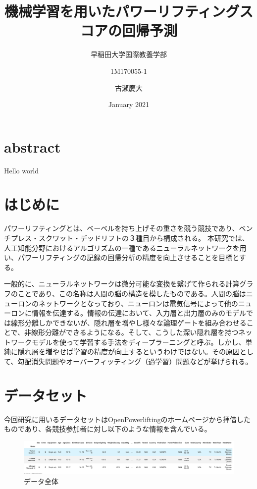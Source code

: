 \documentclass{article}
\title{機械学習を用いたパワーリフティングスコアの回帰予測}
\author{早稲田大学国際教養学部 }
\author{1M170055-1 }
\author{古瀬慶大 }
\date{January 2021}
\begin{document}
\maketitle

\section{abstract}
Hello world




\section{はじめに}
パワーリフティングとは、ベーベルを持ち上げその重さを競う競技であり、ベンチプレス・スクワット・デッドリフトの３種目から構成される。
本研究では、人工知能分野におけるアルゴリズムの一種であるニューラルネットワークを用い、パワーリフティングの記録の回帰分析の精度を向上させることを目標とする。

一般的に、ニューラルネットワークは微分可能な変換を繋げて作られる計算グラフのことであり、この名称は人間の脳の構造を模したものである。人間の脳はニューロンのネットワークとなっており、ニューロンは電気信号によって他のニューロンに情報を伝達する。情報の伝達において、入力層と出力層のみのモデルでは線形分離しかできないが、隠れ層を増やし様々な論理ゲートを組み合わせることで、非線形分離ができるようになる。そして、こうした深い隠れ層を持つネットワークモデルを使って学習する手法をディープラーニングと呼ぶ。しかし、単純に隠れ層を増やせば学習の精度が向上するというわけではない。その原因として、勾配消失問題やオーバーフィッティング（過学習）問題などが挙げられる。


\section{データセット}

今回研究に用いるデータセットはOpenPowerliftingのホームページから拝借したものであり、各競技参加者に対し以下のような情報を含んでいる。

\begin{figure}[H]
\begin{center}
\includegraphics[width=\linewidth]{data_head.png}
\caption{データ全体}
\end{center}
\end{figure}
\end{document}
